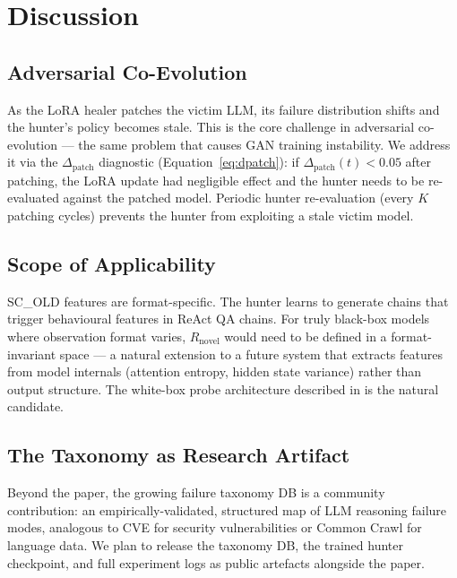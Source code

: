 \documentclass[11pt,a4paper]{article}
\begin{document}
\section{Discussion}
\label{sec:discussion}

\subsection{Adversarial Co-Evolution}

As the LoRA healer patches the victim LLM, its failure distribution shifts
and the hunter's policy becomes stale. This is the core challenge in
adversarial co-evolution --- the same problem that causes GAN training
instability. We address it via the $\Delta_\text{patch}$ diagnostic
(Equation~\ref{eq:dpatch}): if $\Delta_\text{patch}(t) < 0.05$ after patching,
the LoRA update had negligible effect and the hunter needs to be re-evaluated
against the patched model. Periodic hunter re-evaluation (every $K$ patching
cycles) prevents the hunter from exploiting a stale victim model.

\subsection{Scope of Applicability}

SC\_OLD features are format-specific. The hunter learns to generate chains
that trigger behavioural features in ReAct QA chains. For truly black-box
models where observation format varies, $R_\text{novel}$ would need to be
defined in a format-invariant space --- a natural extension to a future
system that extracts features from model internals (attention entropy,
hidden state variance) rather than output structure. The white-box probe
architecture described in \cite{qppg2025} is the natural candidate.

\subsection{The Taxonomy as Research Artifact}

Beyond the paper, the growing failure taxonomy DB is a community contribution:
an empirically-validated, structured map of LLM reasoning failure modes,
analogous to CVE for security vulnerabilities or Common Crawl for language data.
We plan to release the taxonomy DB, the trained hunter checkpoint, and full
experiment logs as public artefacts alongside the paper.
\end{document}
